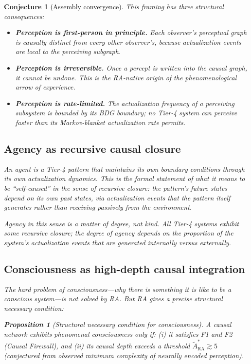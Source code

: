 \documentclass[11pt]{article}
\newtheorem{proposition}{Proposition}
\newtheorem{conjecture}{Conjecture}
\begin{document}
\begin{conjecture}[Assembly convergence]
This framing has three structural consequences:
\begin{itemize}[nosep]
\item \textbf{Perception is first-person in principle.} Each observer's perceptual graph is causally distinct from every other observer's, because actualization events are local to the perceiving subgraph.
\item \textbf{Perception is irreversible.} Once a percept is written into the causal graph, it cannot be undone. This is the RA-native origin of the phenomenological arrow of experience.
\item \textbf{Perception is rate-limited.} The actualization frequency of a perceiving subsystem is bounded by its BDG boundary; no Tier-4 system can perceive faster than its Markov-blanket actualization rate permits.
\end{itemize}

\subsection{Agency as recursive causal closure}

An agent is a Tier-4 pattern that maintains its own boundary conditions through its own actualization dynamics. This is the formal statement of what it means to be ``self-caused'' in the sense of recursive closure: the pattern's future states depend on its own past states, via actualization events that the pattern itself generates rather than receiving passively from the environment.

Agency in this sense is a matter of degree, not kind. All Tier-4 systems exhibit some recursive closure; the degree of agency depends on the proportion of the system's actualization events that are generated internally versus externally.

\subsection{Consciousness as high-depth causal integration}

The hard problem of consciousness---why there is something it is like to be a conscious system---is not solved by RA. But RA gives a precise structural necessary condition:

\begin{proposition}[Structural necessary condition for consciousness]
\label{prop:consciousness}
A causal network exhibits phenomenal consciousness only if: (i) it satisfies F1 and F2 (Causal Firewall), and (ii) its causal depth exceeds a threshold $\tilde{A}_{\mathrm{RA}}^* \gtrsim 5$ (conjectured from observed minimum complexity of neurally encoded perception).
\end{proposition}


\end{conjecture}
\end{document}
